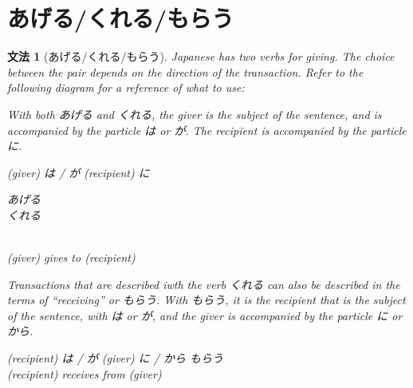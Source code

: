 \documentclass[notoc,notitlepage]{tufte-book}
\newenvironment{lrcases}
  {\left\lbrace\quad\begin{aligned}}
  {\end{aligned}\quad\right\rbrace}
\newtheorem{grammar}{\faBook \enspace 文法}[section]
\begin{document}

\section{あげる/くれる/もらう}%
\label{sec:ageru_kureru_morau}

\begin{grammar}[あげる/くれる/もらう]
\label{grammar:ageru_kureru_morau}
  Japanese has two verbs for giving. The choice between the pair depends on the direction of the transaction. Refer to the following diagram for a reference of what to use:
  \begin{center}
  \end{center}
  With both あげる and くれる, the giver is the subject of the sentence, and is accompanied by the particle は or が. The recipient is accompanied by the particle に.
  \begin{center}
    (giver) は / が (recipient) に \begin{lrcases}あげる \\ くれる \end{lrcases} \\
    (giver) gives to (recipient)
  \end{center}
  Transactions that are described iwth the verb くれる can also be described in the terms of ``receiving'' or もらう. With もらう, it is the recipient that is the subject of the sentence, with は or が, and the giver is accompanied by the particle に or から.
  \begin{center}
    (recipient) は / が (giver) に / から もらう \\
    (recipient) receives from (giver)
  \end{center}
\end{grammar}
\end{document}
